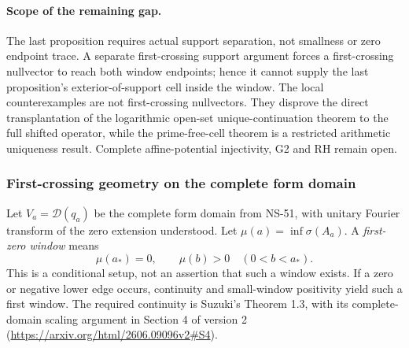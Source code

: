 \documentclass[11pt]{article}
\theoremstyle{remark}
\begin{document}
\paragraph{Scope of the remaining gap.}
The last proposition requires actual support separation, not smallness
or zero endpoint trace. A separate first-crossing support argument forces
a first-crossing nullvector to reach both window endpoints; hence it
cannot supply the last proposition's exterior-of-support cell inside
the window. The local counterexamples are not first-crossing nullvectors.
They disprove the direct transplantation of the logarithmic open-set
unique-continuation theorem to the full shifted operator, while the
prime-free-cell theorem is a restricted arithmetic uniqueness result.
Complete affine-potential injectivity, G2 and RH remain open.

\subsubsection*{First-crossing geometry on the complete form domain}

Let $V_a=\mathcal D(q_a)$ be the complete form domain from NS-51,
with unitary Fourier transform of the zero extension understood.
Let $\mu(a)=\inf\sigma(A_a)$. A \emph{first-zero window} means
\begin{equation}\label{eq:ns55fc-first}
 \mu(a_*)=0,\qquad \mu(b)>0\quad(0<b<a_*).
\end{equation}
This is a conditional setup, not an assertion that such a window exists.
If a zero or negative lower edge occurs, continuity and small-window
positivity yield such a first window. The required continuity is
Suzuki's Theorem 1.3, with its complete-domain scaling argument in
Section 4 of version 2
(\url{https://arxiv.org/html/2606.09096v2#S4}).
\end{document}
